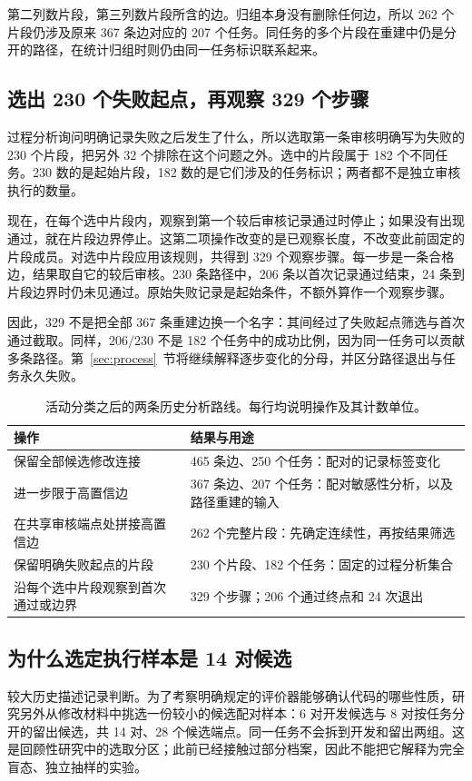 第二列数片段，第三列数片段所含的边。归组本身没有删除任何边，所以 262 个片段仍涉及原来 367 条边对应的 207 个任务。同任务的多个片段在重建中仍是分开的路径，在统计归组时则仍由同一任务标识联系起来。

\subsection{选出 230 个失败起点，再观察 329 个步骤}
\label{subsec:failure-cohort}
过程分析询问明确记录失败之后发生了什么，所以选取第一条审核明确写为失败的 230 个片段，把另外 32 个排除在这个问题之外。选中的片段属于 182 个不同任务。230 数的是起始片段，182 数的是它们涉及的任务标识；两者都不是独立审核执行的数量。

现在，在每个选中片段内，观察到第一个较后审核记录通过时停止；如果没有出现通过，就在片段边界停止。这第二项操作改变的是已观察长度，不改变此前固定的片段成员。对选中片段应用该规则，共得到 329 个观察步骤。每一步是一条合格边，结果取自它的较后审核。230 条路径中，206 条以首次记录通过结束，24 条到片段边界时仍未见通过。原始失败记录是起始条件，不额外算作一个观察步骤。

因此，329 不是把全部 367 条重建边换一个名字：其间经过了失败起点筛选与首次通过截取。同样，$206/230$ 不是 182 个任务中的成功比例，因为同一任务可以贡献多条路径。第~\ref{sec:process}~节将继续解释逐步变化的分母，并区分路径退出与任务永久失败。

\begin{table}[htbp]
\centering\small
\caption{活动分类之后的两条历史分析路线。每行均说明操作及其计数单位。}
\label{tab:units}
\begin{tabularx}{\linewidth}{Y Y}
\toprule
操作 & 结果与用途 \\
\midrule
保留全部候选修改连接 & 465 条边、250 个任务：配对的记录标签变化 \\
进一步限于高置信边 & 367 条边、207 个任务：配对敏感性分析，以及路径重建的输入 \\
在共享审核端点处拼接高置信边 & 262 个完整片段：先确定连续性，再按结果筛选 \\
保留明确失败起点的片段 & 230 个片段、182 个任务：固定的过程分析集合 \\
沿每个选中片段观察到首次通过或边界 & 329 个步骤；206 个通过终点和 24 次退出 \\
\bottomrule
\end{tabularx}
\end{table}

\subsection{为什么选定执行样本是 14 对候选}
\label{subsec:execution-sample}
较大历史描述记录判断。为了考察明确规定的评价器能够确认代码的哪些性质，研究另外从修改材料中挑选一份较小的候选配对样本：6 对开发候选与 8 对按任务分开的留出候选，共 14 对、28 个候选端点。同一任务不会拆到开发和留出两组。这是回顾性研究中的选取分区；此前已经接触过部分档案，因此不能把它解释为完全盲态、独立抽样的实验。

